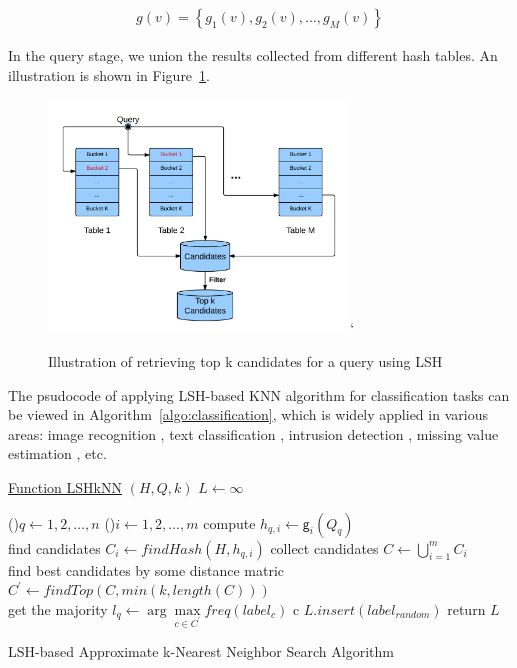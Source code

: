 \documentclass[letterpaper,twocolumn,10pt]{article}
\theoremstyle{definition}
\begin{document}
\begin{align*}
g(v) = \left\{g_1(v), g_2(v), ..., g_M(v)\right\}
\end{align*}

In the query stage, we union the results 
collected from different hash tables. An illustration is shown in Figure~\ref{figure:topk-illustration}.

\begin{figure}[t]
	\center
	\includegraphics[width=8cm]{graph.png}`
	\vspace{-0.5cm}
	\caption{Illustration of retrieving top k candidates for a query using LSH}
	\label{figure:topk-illustration}
	\vspace{-1cm}
\end{figure}

The psudocode of applying LSH-based KNN algorithm
for classification tasks can be viewed in Algorithm~\ref{algo:classification}, which is widely applied in 
various areas: 
image recognition \cite{lee1991handwritten}, text classification \cite{tan2006effective}, intrusion 
detection \cite{liao2002use}, missing value estimation \cite{acuna2004treatment},  etc. 

\begin{algorithm}[h]
	\underline{Function LSHkNN} $(H, Q, k)$\;
	$L \leftarrow \infty$
	
	\For(){$q\leftarrow 1, 2, \ldots, n$ }{
		\For(){$i\leftarrow 1, 2, \ldots, m$}{        
			compute $h_{q, i} \leftarrow  \mathsf{g}_i(Q_q)$ \\
			find candidates $C_i \leftarrow findHash(H, h_{q, i})$
		}
		collect candidates $C \leftarrow \bigcup\limits_{i=1}^{m} C_{i}$ \\

		{
			find best candidates by some distance matric $C^{\prime} \leftarrow findTop(C, min(k, length(C)))$ \\
			get the majority $l_q \leftarrow \arg \max\limits_{c \in C^{\prime}} freq(label_c)$
			c
		}
		{
			$L.insert(label_{random})$
		}
	}
	return $L$\;
		
	\caption{LSH-based Approximate k-Nearest Neighbor Search Algorithm}
	\label{algo:classification}
\end{algorithm}
\end{document}
